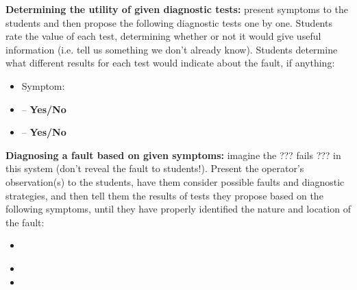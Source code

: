 \vskip 10pt


\noindent
{\bf Determining the utility of given diagnostic tests:} present symptoms to the students and then propose the following diagnostic tests one by one.  Students rate the value of each test, determining whether or not it would give useful information (i.e. tell us something we don't already know).  Students determine what different results for each test would indicate about the fault, if anything:

\begin{itemize}
\item{} Symptom: {\it }
\item{}  -- {\bf Yes/No}
\item{}  -- {\bf Yes/No}
\end{itemize}


\vskip 10pt


\noindent
{\bf Diagnosing a fault based on given symptoms:} imagine the ??? fails ??? in this system (don't reveal the fault to students!).  Present the operator's observation(s) to the students, have them consider possible faults and diagnostic strategies, and then tell them the results of tests they propose based on the following symptoms, until they have properly identified the nature and location of the fault:

\begin{itemize}
\item{} {\it }
\item{} 
\item{} 
\end{itemize}




